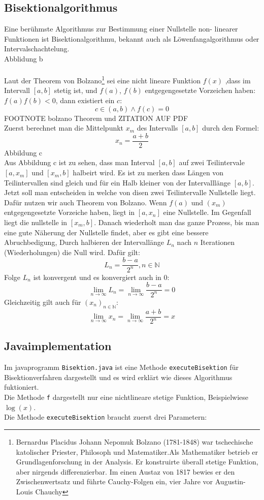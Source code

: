 \subsection{Bisektionalgorithmus}
Eine berühmste Algorithmus zur Bestimmung  einer Nullstelle non- linearer Funktionen ist Bisektionalgorithmu, bekannt auch als Löwenfangalgorithmus oder Intervalschachtelung.
\\
Abblidung b
\\
\\
Laut der Theorem von Bolzano\footnote{Bernardus Placidus Johann Nepomuk Bolzano (1781-1848) war tschechische katolischer Priester, Philosoph und Matematiker.Als Mathematiker betrieb er Grundlagenforschung in der Analysis. Er konstruirte überall stetige Funktion, aber nirgends differenzierbar.
Im einen Austaz von 1817 bewies er den Zwischenwertsatz und führte Cauchy-Folgen ein, vier Jahre vor Augustin- Louis Chauchy} sei eine nicht lineare  Funktion $f(x)$ ,dass im Intervall $[a,b]$ stetig ist,  
und  $f(a)$, $f(b)$ entgegengesetzte Vorzeichen haben: $f(a)f(b)<0$, dann existiert ein $c$:
$$c \in (a,b) \wedge f(c)=0$$ FOOTNOTE bolzano Theorem und ZITATION AUF PDF\\
Zuerst berechnet man die Mittelpunkt $x_m$ des Intervalls $[a,b]$ durch den Formel:
$$ x_n = \frac{a+b}{2}$$
Abbildung c
\\
Aus Abbildung c ist zu sehen, dass man Interval $[a,b]$ auf zwei Teilintervale $[a,x_m]$ und $[x_m,b]$ halbeirt wird. Es ist zu merken dass Längen von Teilintervallen sind gleich und für ein Halb kleiner von der Intervalllänge $[a,b]$. 
Jetzt soll man entscheiden in welche von disen zwei Teilintervalle Nullstelle liegt. Dafür nutzen wir auch Theorem von Bolzano. 
Wenn $f(a)$ und $(x_m)$ entgegengesetzte Vorzeiche haben, liegt in $[a,x_n]$ eine Nullstelle. Im Gegenfall liegt die nullstelle in $[x_m,b]$.
Danach wiederholt man das ganze  Prozess, bis man eine gute Näherung der Nullstelle findet, aber es gibt eine bessere Abruchbedigung, Durch halbieren der Intervallänge $L_n$ nach $n$ Iterationen (Wiederholungen) die Null wird. Dafür gilt:
$$L_n = \frac{b-a}{2^n}, n \in \mathbb{N}$$ Folge $L_n$ ist konvergent und es konvergiert auch in 0:
$$\lim_{n \to \infty}L_n = \lim_{n \to \infty}\frac{b-a}{2^n}=0$$
Gleichzeitig gilt auch für $(x_n)_{n \in \mathbb{N}}$:
$$\lim_{n \to \infty} x_n =\lim_{n \to \infty}\frac{a+b}{2^n} =x$$

\subsection{Javaimplementation}
Im javaprogramm \verb|Bisektion.java| ist eine Methode \verb|executeBisektion| für Bisektionverfahren dargestellt und es wird erklärt wie dieses Algorithmus fuktioniert.\\
Die Methode \verb|f| dargestellt nur eine nichtlineare stetige Funktion, Beispielwiese $\log(x)$.
\\
Die Methode \verb|executeBisektion| braucht zuerst drei Parametern:

